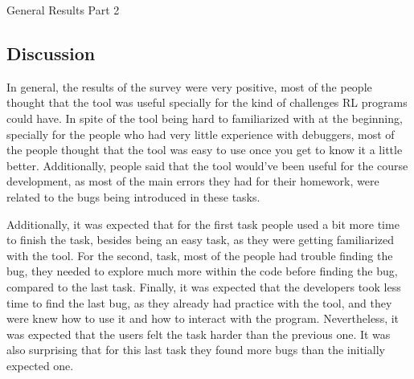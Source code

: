 \begin{table}[H]
  \centering
  \caption{General Results Part 2}
  
  \label{tab:general2-debuggers}
\end{table}

% 

\subsection{Discussion}
\label{sec:discussion}

In general, the results of the survey were very positive, most of the people thought that 
the tool was useful specially for the kind of challenges \ac{RL} programs could have. In 
spite of the tool being hard to familiarized with at the beginning, specially for the people who had very 
little experience with debuggers, most of the people thought that the tool was easy to use 
once you get to know it a little better. Additionally, people said that the tool would've 
been useful for the course development, as most of the main errors they had for their homework,
were related to the bugs being introduced in these tasks.

Additionally, it was expected that for the first task people used a bit more time to finish the 
task, besides being an easy task, as they were getting familiarized with the tool. For the second,
task, most of the people had trouble finding the bug, they needed to explore much more within the 
code before finding the bug, compared to the last task. Finally, it was expected that the developers
took less time to find the last bug, as they already had practice with the tool, and they were 
knew how to use it and how to interact with the program. Nevertheless, it was expected that 
the users felt the task harder than the previous one. It was also surprising that for this last task 
they found more bugs than the initially expected one.


\endinput

